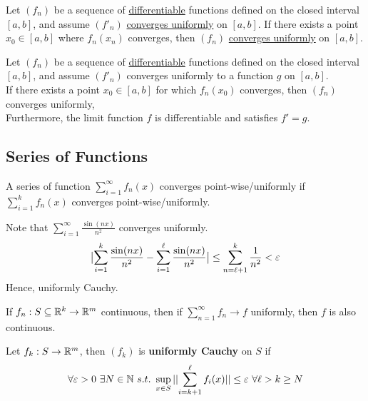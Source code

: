\documentclass[11pt]{article}
\begin{document}
	\begin{theorem}
		Let $(f_n)$ be a sequence of \ul{differentiable} functions defined on the closed interval $[a, b]$, and assume $(f'_n)$ \ul{converges uniformly} on $[a, b]$. If there exists a point $x_0 \in [a, b]$ where $f_n(x_n)$ converges, then $(f_n)$ \ul{converges uniformly} on $[a, b]$.
	\end{theorem}
	
	\begin{theorem}
		Let $(f_n)$ be a sequence of \ul{differentiable} functions defined on the closed interval $[a, b]$, and assume $(f'_n)$ converges uniformly to a function $g$ on $[a, b]$. \\
		If there exists a point $x_0 \in [a, b]$ for which $f_n(x_0)$ converges, then $(f_n)$ converges uniformly, \\
		Furthermore, the limit function $f$ is differentiable and satisfies $f' = g$.
	\end{theorem}
	
	\subsection{Series of Functions}
	\begin{definition}
		A series of function $\sum_{i=1}^\infty f_n(x)$ converges point-wise/uniformly if $\sum_{i=1}^k f_n(x)$ converges point-wise/uniformly.
 	\end{definition}
 	
 	\begin{example}
 		Note that $\sum_{i=1}^\infty \frac{\sin(nx)}{n^2}$ converges uniformly.
 		\begin{align}
 			\big \vert {\sum_{i=1}^k \frac{\sin(nx)}{n^2} - \sum_{i=1}^\ell \frac{\sin(nx)}{n^2}} \big \vert \leq \sum_{n=\ell+1}^k \frac{1}{n^2} < \varepsilon
 		\end{align}
 		Hence, uniformly Cauchy.
 	\end{example}
 	
 	\begin{theorem}
 		If $f_n: S \subseteq \mathbb{R}^k \to \mathbb{R}^m$ continuous, then if $\sum_{n=1}^\infty f_n \to f$ uniformly, then $f$ is also continuous.
 	\end{theorem}
 	
 	\begin{definition}
 		Let $f_k: S \to \mathbb{R}^m$, then $(f_k)$ is \textbf{uniformly Cauchy} on $S$ if 
 		\begin{align}
 			\forall \varepsilon > 0\ \exists N \in \mathbb{N}\ s.t.\ \sup_{x \in S} \vert \vert {\sum_{i=k+1}^\ell f_i(x)} \vert \vert \leq \varepsilon\ \forall \ell > k \geq N
 		\end{align}
 	\end{definition}
 	
\end{document}
